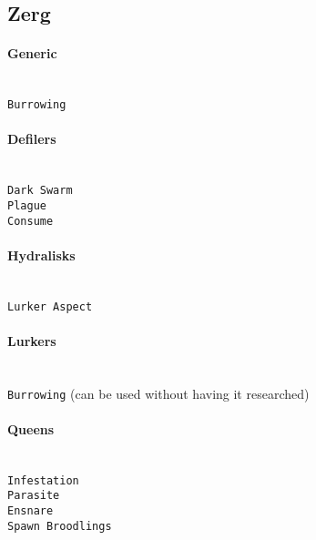 \subsection{Zerg}

\paragraph{Generic} \mbox{}\\
\verb|Burrowing|

\paragraph{Defilers} \mbox{}\\
\verb|Dark Swarm| \\
\verb|Plague| \\
\verb|Consume| 

\paragraph{Hydralisks} \mbox{}\\
\verb|Lurker Aspect|

\paragraph{Lurkers} \mbox{}\\
\verb|Burrowing| (can be used without having it researched)

\paragraph{Queens} \mbox{}\\
\verb|Infestation| \\
\verb|Parasite| \\
\verb|Ensnare| \\
\verb|Spawn Broodlings|
